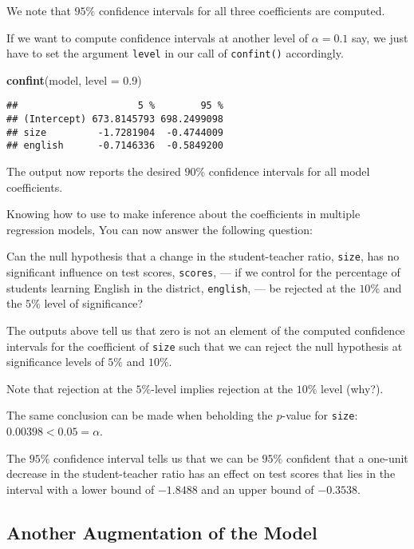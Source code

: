 \documentclass[]{book}
\newenvironment{Shaded}{\begin{snugshade}}{\end{snugshade}}
\newcommand{\KeywordTok}[1]{\textcolor[rgb]{0.13,0.29,0.53}{\textbf{#1}}}
\newcommand{\DataTypeTok}[1]{\textcolor[rgb]{0.13,0.29,0.53}{#1}}
\newcommand{\FloatTok}[1]{\textcolor[rgb]{0.00,0.00,0.81}{#1}}
\newcommand{\NormalTok}[1]{#1}
\theoremstyle{definition}
\theoremstyle{definition}
\theoremstyle{definition}
\theoremstyle{remark}
\begin{document}
We note that \(95\%\) confidence intervals for all three coefficients
are computed.

If we want to compute confidence intervals at another level of
\(\alpha=0.1\) say, we just have to set the argument \texttt{level} in
our call of \texttt{confint()} accordingly.

\begin{Shaded}
\begin{Highlighting}[]
\KeywordTok{confint}\NormalTok{(model, }\DataTypeTok{level =} \FloatTok{0.9}\NormalTok{)}
\end{Highlighting}
\end{Shaded}

\begin{verbatim}
##                     5 %        95 %
## (Intercept) 673.8145793 698.2499098
## size         -1.7281904  -0.4744009
## english      -0.7146336  -0.5849200
\end{verbatim}

The output now reports the desired \(90\%\) confidence intervals for all
model coefficients.

Knowing how to use to make inference about the coefficients in multiple
regression models, You can now answer the following question:

Can the null hypothesis that a change in the student-teacher ratio,
\texttt{size}, has no significant influence on test scores,
\texttt{scores}, --- if we control for the percentage of students
learning English in the district, \texttt{english}, --- be rejected at
the \(10\%\) and the \(5\%\) level of significance?

The outputs above tell us that zero is not an element of the computed
confidence intervals for the coefficient of \texttt{size} such that we
can reject the null hypothesis at significance levels of \(5\%\) and
\(10\%\).

Note that rejection at the \(5\%\)-level implies rejection at the
\(10\%\) level (why?).

The same conclusion can be made when beholding the \(p\)-value for
\texttt{size}: \(0.00398 < 0.05 = \alpha\).

The \(95\%\) confidence interval tells us that we can be \(95\%\)
confident that a one-unit decrease in the student-teacher ratio has an
effect on test scores that lies in the interval with a lower bound of
\(-1.8488\) and an upper bound of \(-0.3538\).

\subsection*{Another Augmentation of the
Model}\label{another-augmentation-of-the-model}
\end{document}
